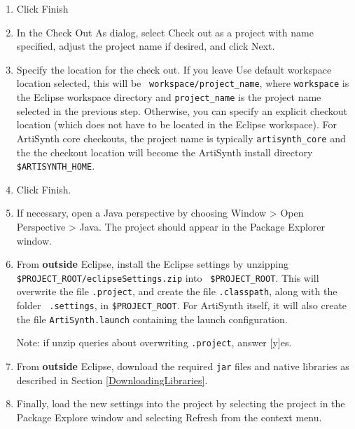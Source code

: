 \documentclass{article}
\def\SEP{/}
\def\directory{directory }
\begin{document}
\begin{enumerate}
\item Click {\sf Finish}

\item In the {\sf Check Out As} dialog, select {\sf Check out as a
project with name specified}, adjust the project name if desired,
and click {\sf Next}.

\item Specify the location for the check out. If you leave {\sf Use
default workspace location} selected, this will be {\tt
workspace/project\_name}, where {\tt workspace} is the Eclipse
workspace \directory and {\tt project\_name} is the project name
selected in the previous step. Otherwise, you can specify an explicit
checkout location (which does not have to be located in the Eclipse
workspace). For ArtiSynth core checkouts, the project name is
typically {\tt artisynth\_core} and the the checkout location will
become the ArtiSynth install \directory {\tt \$ARTISYNTH\_HOME}.

\item Click {\sf Finish}.

\item If necessary, open a Java perspective by choosing {\sf Window >
Open Perspective > Java}. The project should appear in the {\sf
Package Explorer} window.

\item From {\bf outside} Eclipse, install the Eclipse settings by
unzipping {\tt \$PROJECT\_ROOT\SEP eclipse\-Settings.zip} into {\tt
\$PROJECT\_ROOT}. This will overwrite the file {\tt .project}, and
create the file {\tt .classpath}, along with the folder {\tt
.settings}, in {\tt \$PROJECT\_ROOT}.  For ArtiSynth itself, it will
also create the file {\tt ArtiSynth.launch} containing the launch
configuration.

\begin{sideblock}
Note: if unzip queries about overwriting {\tt .project}, answer [y]es.
\end{sideblock}

\item From {\bf outside} Eclipse, download
the required {\tt jar}
files and native libraries as described in Section \ref{DownloadingLibraries}.

\item Finally, load the new settings into the project by selecting the
project in the {\sf Package Explore} window and selecting {\sf
Refresh} from the context menu.

\end{enumerate}
\end{document}
